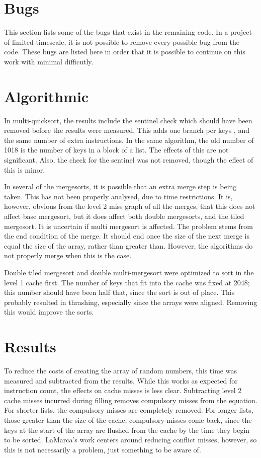 \section{Bugs}
This section lists some of the bugs that exist in the remaining code. In a
project of limited timescale, it is not possible to remove every possible bug
from the code. These bugs are listed here in order that it is possible to
continue on this work with minimal difficutly.

\section{Algorithmic}

\label{bug1}
In multi-quicksort, the results include the sentinel check which should have
been removed before the results were measured. This adds one branch per  keys , and the same number of extra instructions. In the same
algorithm, the old number of 1018 is the number of keys in a block of a list.
The effects of this are not significant. Also, the check for the sentinel was
not removed, though the effect of this is minor.

\label{bug2}
In several of the mergesorts, it is possible that an extra merge step is being
taken. This has not been properly analysed, due to time restrictions. It is,
however, obvious from the level 2 miss graph of all the merges, that this
does not affect base mergesort, but it does affect both double mergesorts, and
the tiled mergesort. It is uncertain if multi mergesort is affected. The problem
stems from the end condition of the merge. It should end once the size of the next
merge is equal the size of the array, rather than greater than. However, the
algorithms do not properly merge when this is the case.

\label{bug4}
Double tiled mergesort and double multi-mergesort were optimized to sort in the
level 1 cache first. The number of keys that fit into the cache was fixed at
2048; this number should have been half that, since the sort is out of place.
This probably resulted in thrashing, especially since the arrays were aligned.
Removing this would improve the sorts.

\section{Results}
\label{bug3}
To reduce the costs of creating the array of random numbers, this time was
measured and subtracted from the results. While this works as expected for
instruction count, the effects on cache misses is less clear. Subtracting level
2 cache misses incurred during filling removes compulsory misses from the
equation. For shorter lists, the compulsory misses are completely removed.
For longer lists, those greater than the size of the cache, compulsory misses
come back, since the keys at the start of the array are flushed from the cache
by the time they begin to be sorted. LaMarca's work centers around
reducing conflict misses, however, so this is not necessarily a problem, just
something to be aware of.
